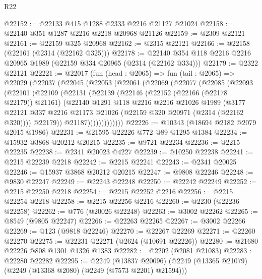 \begin{lexlean}{R22}
\begin{coremodule}
@22152 := @22133 @415 @1288 @2333 @2216 @21127 @21024
@22158 := @22140 @351 @1287 @2216 @2218 @20968 @21126
@22159 := @2309 @22121
@22161 := @22159 @325 @20968
@22162 := @2315 @22121
@22166 := @22158 (@22161 (@2314 (@22162 @325)))
@22178 := @22140 @354 @118 @2216 @2216 @20965 @1989 (@22159 @334 @20965 (@2314 (@22162 @334)))
@22179 := @2322 @22121
@22221 := @22017
    (fun (head : @2065) =>
    fun (tail : @2065) =>
    @22029
      (@22037
        (@22045
          (@22053
            (@22061
              (@22069
                (@22077
                  (@22085
                    (@22093
                      (@22101
                        (@22109
                          (@22131
                            (@22139
                              (@22146
                                (@22152 (@22166 (@22178 @22179)) @21161)
                                (@22140
                                  @1291
                                  @118
                                  @2216
                                  @2216
                                  @21026
                                  @1989
                                  (@3177
                                    @22121
                                    @337
                                    @2216
                                    @21173
                                    @21026
                                    (@22159 @320 @20971 (@2314 (@22162 @320))))
                                  @22179))
                              @21187)))))))))))))
@22226 := @10343 (@18694 @2182 @2079 @2015 @1986)
@22231 := @21595 @22226 @772 @89 @1295 @1384
@22234 := @15932 @3868 @20212 @20215
@22235 := @9721 @22234
@22236 := @2215 @22235
@22238 := @2341 @20023 @4227
@22239 := @10250 @22238
@22241 := @2215 @22239 @2218
@22242 := @2215 @22241
@22243 := @2341 @20025
@22246 := @15937 @3868 @20212 @20215
@22247 := @9808 @22246
@22248 := @9830 @22247
@22249 := @22243 @22248
@22250 := @22242 @22249
@22252 := @2215 @22250 @2218
@22254 := @2215 @22252 @2216
@22256 := @2215 @22254 @2218
@22258 := @2215 @22256 @2216
@22260 := @2230 (@22236 @22258)
@22262 := @776 (@20026 @22248)
@22263 := @3002 @22262
@22265 := @8549 (@9805 @22247)
@22266 := @22263 @22265
@22267 := @3002 @22266
@22269 := @123 (@9818 @22246)
@22270 := @22267 @22269
@22271 := @22260 @22270
@22275 := @22231 @22271 (@2624 (@10691 @22226))
@22280 := @21680 @22226 @808 @1301 @1326 @1383
@22282 := @2202 (@2081 @21083)
@22283 := @22280 @22282
@22295 := @2249
    (@13837 @20096)
    (@2249 (@13365 @21079) (@2249 (@13368 @2080) (@2249 (@7573 @2201) @21594)))

\end{coremodule}
\end{lexlean}
